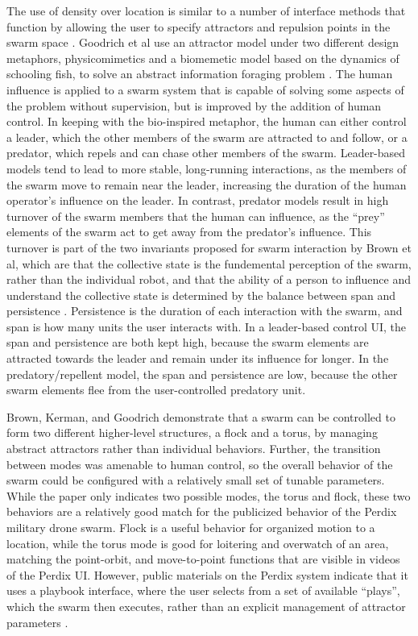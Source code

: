 The use of density over location is similar to a number of interface methods that function by allowing the user to specify attractors and repulsion points in the swarm space \citep{goodrich2011toward, brown2014human, vasile2011integrating, kira2009exerting}. 
Goodrich et al use an attractor model under two different design metaphors, physicomimetics and a biomemetic model based on the dynamics of schooling fish, to solve an abstract information foraging problem \citep{goodrich2011toward}. 
The human influence is applied to a swarm system that is capable of solving some aspects of the problem without supervision, but is improved by the addition of human control. 
In keeping with the bio-inspired metaphor, the human can either control a leader, which the other members of the swarm are attracted to and follow, or a predator, which repels and can chase other members of the swarm. 
Leader-based models tend to lead to more stable, long-running interactions, as the members of the swarm move to remain near the leader, increasing the duration of the human operator's influence on the leader. 
In contrast, predator models result in high turnover of the swarm members that the human can influence, as the ``prey'' elements of the swarm act to get away from the predator's influence. 
This turnover is part of the two invariants proposed for swarm interaction by Brown et al, which are that the collective state is the fundemental perception of the swarm, rather than the individual robot, and that the ability of a person to influence and understand the collective state is determined by the balance between span and persistence \citep{brown2015two}. 
Persistence is the duration of each interaction with the swarm, and span is how many units the user interacts with. 
In a leader-based control UI, the span and persistence are both kept high, because the swarm elements are attracted towards the leader and remain under its influence for longer. 
In the predatory/repellent model, the span and persistence are low, because the other swarm elements flee from the user-controlled predatory unit. 

Brown, Kerman, and Goodrich demonstrate that a swarm can be controlled to form two different higher-level structures, a flock and a torus, by managing abstract attractors rather than individual behaviors. 
Further, the transition between modes was amenable to human control, so the overall behavior of the swarm could be configured with a relatively small set of tunable parameters. 
While the paper only indicates two possible modes, the torus and flock, these two behaviors are a relatively good match for the publicized behavior of the Perdix military drone swarm. 
Flock is a useful behavior for organized motion to a location, while the torus mode is good for loitering and overwatch of an area, matching the point-orbit, and move-to-point functions that are visible in videos of the Perdix UI. 
However, public materials on the Perdix system indicate that it uses a playbook interface, where the user selects from a set of available ``plays'', which the swarm then executes, rather than an explicit management of attractor parameters \citep{PerdixFactsheet}. 

